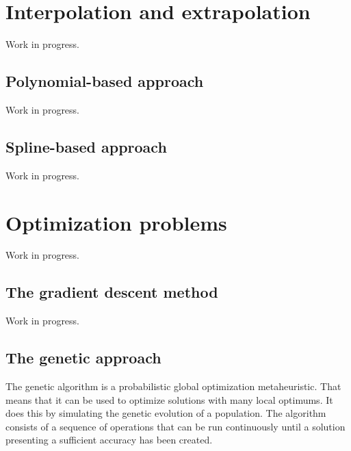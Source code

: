 \documentclass{book}
\begin{document}
\section{Interpolation and extrapolation}

Work in progress.

\subsection{Polynomial-based approach}

Work in progress.

\subsection{Spline-based approach}

Work in progress.

\section{Optimization problems}

Work in progress.

\subsection{The gradient descent method}

Work in progress.

\subsection{The genetic approach}

The genetic algorithm is a probabilistic global optimization metaheuristic. That means that it can be used to optimize solutions with many local optimums.
It does this by simulating the genetic evolution of a population. The algorithm consists of a sequence of operations that can be run continuously until a solution
presenting a sufficient accuracy has been created.
\end{document}
